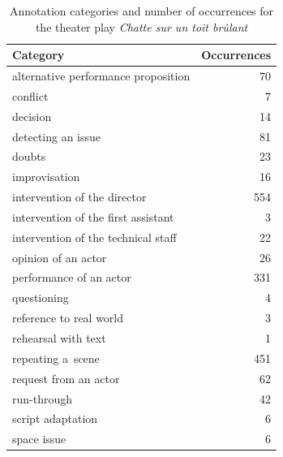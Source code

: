 \documentclass[conference]{IEEEtran}
\newcommand{\todo}[1]{\noindent\textcolor{red}{{\bf \{ToDo} #1{\bf \}}}}
\begin{document}
\begin{table}
\centering
\small
\begin{tabular}{|p{6cm}|r|}
\hline 
Category & Occurrences \\ 
\hline 
alternative performance proposition & 70 \\ 
\hline 
conflict & 7 \\ 
\hline 
decision & 14 \\ 
\hline 
detecting an issue & 81 \\ 
\hline 
doubts & 23 \\ 
\hline 
improvisation & 16 \\ 
\hline 
intervention of the director & 554 \\ 
\hline 
intervention of the first assistant & 3 \\ 
\hline 
intervention of the technical staff & 22 \\ 
\hline 
opinion of an actor & 26 \\ 
\hline 
performance of an actor & 331 \\ 
\hline 
questioning & 4 \\ 
\hline 
reference to real world & 3 \\ 
\hline 
rehearsal with text & 1 \\ 
\hline 
repeating a~scene & 451 \\ 
\hline 
request from an actor & 62 \\ 
\hline 
run-through & 42 \\ 
\hline 
script adaptation & 6 \\ 
\hline 
space issue & 6 \\ 
\hline 
\end{tabular}
\caption{Annotation categories and number of occurrences for the theater play \emph{Chatte sur un toit brûlant}}
\label{table:categories1}
\end{table}
\end{document}
